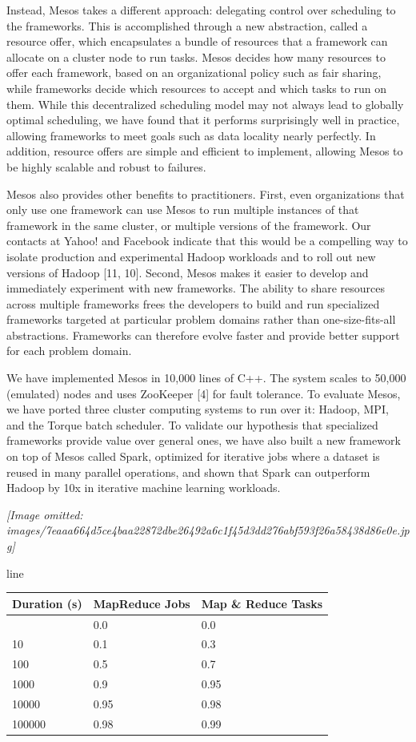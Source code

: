 \documentclass[
]{article}
\newcounter{none} %
\begin{document}
Instead, Mesos takes a different approach: delegating control over
scheduling to the frameworks. This is accomplished through a new
abstraction, called a resource offer, which encapsulates a bundle of
resources that a framework can allocate on a cluster node to run tasks.
Mesos decides how many resources to offer each framework, based on an
organizational policy such as fair sharing, while frameworks decide
which resources to accept and which tasks to run on them. While this
decentralized scheduling model may not always lead to globally optimal
scheduling, we have found that it performs surprisingly well in
practice, allowing frameworks to meet goals such as data locality nearly
perfectly. In addition, resource offers are simple and efficient to
implement, allowing Mesos to be highly scalable and robust to failures.

Mesos also provides other benefits to practitioners. First, even
organizations that only use one framework can use Mesos to run multiple
instances of that framework in the same cluster, or multiple versions of
the framework. Our contacts at Yahoo! and Facebook indicate that this
would be a compelling way to isolate production and experimental Hadoop
workloads and to roll out new versions of Hadoop {[}11, 10{]}. Second,
Mesos makes it easier to develop and immediately experiment with new
frameworks. The ability to share resources across multiple frameworks
frees the developers to build and run specialized frameworks targeted at
particular problem domains rather than one-size-fits-all abstractions.
Frameworks can therefore evolve faster and provide better support for
each problem domain.

We have implemented Mesos in 10,000 lines of C++. The system scales to
50,000 (emulated) nodes and uses ZooKeeper {[}4{]} for fault tolerance.
To evaluate Mesos, we have ported three cluster computing systems to run
over it: Hadoop, MPI, and the Torque batch scheduler. To validate our
hypothesis that specialized frameworks provide value over general ones,
we have also built a new framework on top of Mesos called Spark,
optimized for iterative jobs where a dataset is reused in many parallel
operations, and shown that Spark can outperform Hadoop by 10x in
iterative machine learning workloads.

\textit{[Image omitted: images/7eaaa664d5ce4baa22872dbe26492a6c1f45d3dd276abf593f26a58438d86e0e.jpg]}

line

{\def\LTcaptype{none} %
\begin{longtable}[]{@{}lll@{}}
\toprule\noalign{}
Duration (s) & MapReduce Jobs & Map \& Reduce Tasks \\
\midrule\noalign{}
\endhead
\bottomrule\noalign{}
\endlastfoot
1 & 0.0 & 0.0 \\
10 & 0.1 & 0.3 \\
100 & 0.5 & 0.7 \\
1000 & 0.9 & 0.95 \\
10000 & 0.95 & 0.98 \\
100000 & 0.98 & 0.99 \\
\end{longtable}
}
\end{document}

